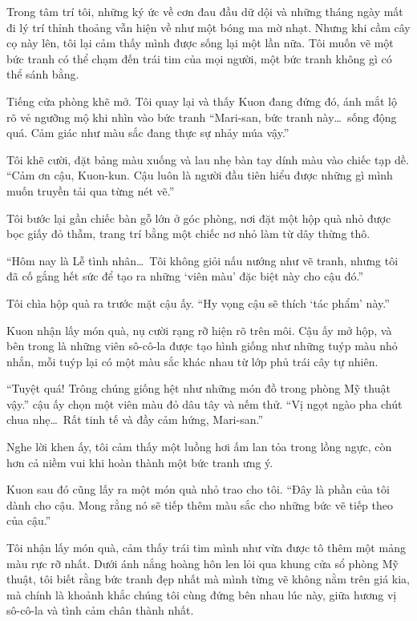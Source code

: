 \documentclass[../main.tex]{subfiles}
\begin{document}
Trong tâm trí tôi, những ký ức về cơn đau đầu dữ dội và những tháng ngày mất đi lý trí thỉnh thoảng vẫn hiện về như một bóng ma mờ nhạt. Nhưng khi cầm cây cọ này lên, tôi lại cảm thấy mình được sống lại một lần nữa. Tôi muốn vẽ một bức tranh có thể chạm đến trái tim của mọi người, một bức tranh không gì có thể sánh bằng.

Tiếng cửa phòng khẽ mở. Tôi quay lại và thấy Kuon đang đứng đó, ánh mắt lộ rõ vẻ ngưỡng mộ khi nhìn vào bức tranh ``Mari-san, bức tranh này\dots\ sống động quá. Cảm giác như màu sắc đang thực sự nhảy múa vậy.''

Tôi khẽ cười, đặt bảng màu xuống và lau nhẹ bàn tay dính màu vào chiếc tạp dề. ``Cảm ơn cậu, Kuon-kun. Cậu luôn là người đầu tiên hiểu được những gì mình muốn truyền tải qua từng nét vẽ.''

Tôi bước lại gần chiếc bàn gỗ lớn ở góc phòng, nơi đặt một hộp quà nhỏ được bọc giấy đỏ thẫm, trang trí bằng một chiếc nơ nhỏ làm từ dây thừng thô.

``Hôm nay là Lễ tình nhân\dots\ Tôi không giỏi nấu nướng như vẽ tranh, nhưng tôi đã cố gắng hết sức để tạo ra những `viên màu' đặc biệt này cho cậu đó.''

Tôi chìa hộp quà ra trước mặt cậu ấy. ``Hy vọng cậu sẽ thích `tác phẩm' này.''

Kuon nhận lấy món quà, nụ cười rạng rỡ hiện rõ trên môi. Cậu ấy mở hộp, và bên trong là những viên sô-cô-la được tạo hình giống như những tuýp màu nhỏ nhắn, mỗi tuýp lại có một màu sắc khác nhau từ lớp phủ trái cây tự nhiên.

``Tuyệt quá! Trông chúng giống hệt như những món đồ trong phòng Mỹ thuật vậy.'' cậu ấy chọn một viên màu đỏ dâu tây và nếm thử. ``Vị ngọt ngào pha chút chua nhẹ\dots\ Rất tinh tế và đầy cảm hứng, Mari-san.''

Nghe lời khen ấy, tôi cảm thấy một luồng hơi ấm lan tỏa trong lồng ngực, còn hơn cả niềm vui khi hoàn thành một bức tranh ưng ý.

Kuon sau đó cũng lấy ra một món quà nhỏ trao cho tôi. ``Đây là phần của tôi dành cho cậu. Mong rằng nó sẽ tiếp thêm màu sắc cho những bức vẽ tiếp theo của cậu.''

Tôi nhận lấy món quà, cảm thấy trái tim mình như vừa được tô thêm một mảng màu rực rỡ nhất. Dưới ánh nắng hoàng hôn len lỏi qua khung cửa sổ phòng Mỹ thuật, tôi biết rằng bức tranh đẹp nhất mà mình từng vẽ không nằm trên giá kia, mà chính là khoảnh khắc chúng tôi cùng đứng bên nhau lúc này, giữa hương vị sô-cô-la và tình cảm chân thành nhất.
\end{document}
